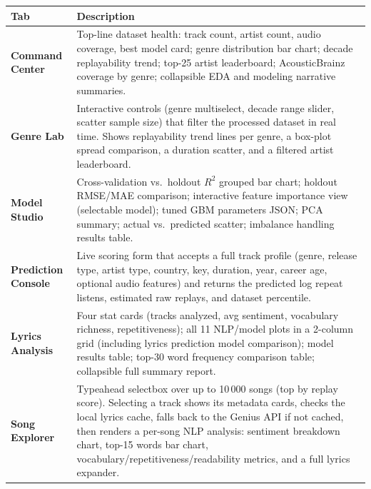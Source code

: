 \documentclass[11pt, letterpaper]{article}
\begin{document}
\begin{longtable}{>{\bfseries\small}p{3.2cm} p{11.3cm}}
\toprule
Tab & Description \\
\midrule
Command Center &
    Top-line dataset health: track count, artist count, audio coverage, best
    model card; genre distribution bar chart; decade replayability trend;
    top-25 artist leaderboard; AcousticBrainz coverage by genre;
    collapsible EDA and modeling narrative summaries. \\[4pt]

Genre Lab &
    Interactive controls (genre multiselect, decade range slider, scatter
    sample size) that filter the processed dataset in real time. Shows
    replayability trend lines per genre, a box-plot spread comparison,
    a duration scatter, and a filtered artist leaderboard. \\[4pt]

Model Studio &
    Cross-validation vs.\ holdout $R^2$ grouped bar chart; holdout RMSE/MAE
    comparison; interactive feature importance view (selectable model);
    tuned GBM parameters JSON; PCA summary; actual vs.\ predicted scatter;
    imbalance handling results table. \\[4pt]

Prediction Console &
    Live scoring form that accepts a full track profile (genre, release type,
    artist type, country, key, duration, year, career age, optional audio
    features) and returns the predicted log repeat listens, estimated raw
    replays, and dataset percentile. \\[4pt]

Lyrics Analysis &
    Four stat cards (tracks analyzed, avg sentiment, vocabulary richness,
    repetitiveness); all 11 NLP/model plots in a 2-column grid (including
    lyrics prediction model comparison); model results table; top-30 word
    frequency comparison table; collapsible full summary report. \\[4pt]

Song Explorer &
    Typeahead selectbox over up to 10\,000 songs (top by replay score).
    Selecting a track shows its metadata cards, checks the local lyrics cache,
    falls back to the Genius API if not cached, then renders a per-song
    NLP analysis: sentiment breakdown chart, top-15 words bar chart,
    vocabulary/repetitiveness/readability metrics, and a full lyrics expander. \\

\bottomrule
\end{longtable}
\end{document}
